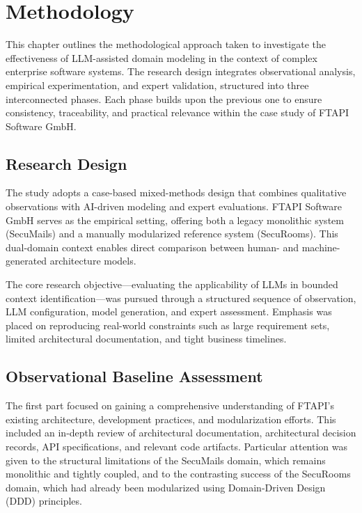 \chapter{Methodology}

This chapter outlines the methodological approach taken to investigate the effectiveness of LLM-assisted domain modeling in the context of complex enterprise software systems. The research design integrates observational analysis, empirical experimentation, and expert validation, structured into three interconnected phases. Each phase builds upon the previous one to ensure consistency, traceability, and practical relevance within the case study of FTAPI Software GmbH.

\section{Research Design}

The study adopts a case-based mixed-methods design that combines qualitative observations with AI-driven modeling and expert evaluations. FTAPI Software GmbH serves as the empirical setting, offering both a legacy monolithic system (SecuMails) and a manually modularized reference system (SecuRooms). This dual-domain context enables direct comparison between human- and machine-generated architecture models.

The core research objective—evaluating the applicability of LLMs in bounded context identification—was pursued through a structured sequence of observation, LLM configuration, model generation, and expert assessment. Emphasis was placed on reproducing real-world constraints such as large requirement sets, limited architectural documentation, and tight business timelines.

\section{Observational Baseline Assessment}

The first part focused on gaining a comprehensive understanding of FTAPI's existing architecture, development practices, and modularization efforts. This included an in-depth review of architectural documentation, architectural decision records, API specifications, and relevant code artifacts. Particular attention was given to the structural limitations of the SecuMails domain, which remains monolithic and tightly coupled, and to the contrasting success of the SecuRooms domain, which had already been modularized using Domain-Driven Design (DDD) principles.

